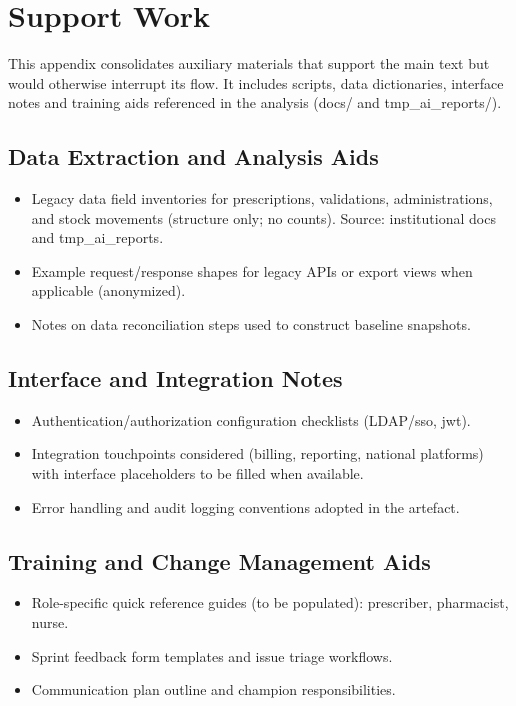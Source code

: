 \chapter{Support Work}
\label{app:support_work}

This appendix consolidates auxiliary materials that support the main text but would otherwise interrupt its flow. It includes scripts, data dictionaries, interface notes and training aids referenced in the analysis (docs/ and tmp\_ai\_reports/).

\section{Data Extraction and Analysis Aids}
\begin{itemize}
    \item Legacy data field inventories for prescriptions, validations, administrations, and stock movements (structure only; no counts). Source: institutional docs and tmp\_ai\_reports.
    \item Example request/response shapes for legacy APIs or export views when applicable (anonymized).
    \item Notes on data reconciliation steps used to construct baseline snapshots.
\end{itemize}

\section{Interface and Integration Notes}
\begin{itemize}
    \item Authentication/authorization configuration checklists (LDAP/\gls{sso}, \gls{jwt}).
    \item Integration touchpoints considered (billing, reporting, national platforms) with interface placeholders to be filled when available.
    \item Error handling and audit logging conventions adopted in the artefact.
\end{itemize}

\section{Training and Change Management Aids}
\begin{itemize}
    \item Role-specific quick reference guides (to be populated): prescriber, pharmacist, nurse.
    \item Sprint feedback form templates and issue triage workflows.
    \item Communication plan outline and champion responsibilities.
\end{itemize}

